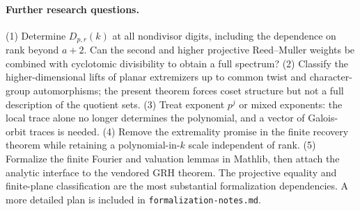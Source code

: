 \documentclass[11pt]{article}
\theoremstyle{remark}\newtheorem{remark}[theorem]{Remark}
\begin{document}
\paragraph{Further research questions.}
(1) Determine $D_{p,r}(k)$ at all nondivisor digits, including the dependence on rank beyond $a+2$. Can the second and higher projective Reed--Muller weights be combined with cyclotomic divisibility to obtain a full spectrum? (2) Classify the higher-dimensional lifts of planar extremizers up to common twist and character-group automorphisms; the present theorem forces coset structure but not a full description of the quotient sets. (3) Treat exponent $p^j$ or mixed exponents: the local trace alone no longer determines the polynomial, and a vector of Galois-orbit traces is needed. (4) Remove the extremality promise in the finite recovery theorem while retaining a polynomial-in-$k$ scale independent of rank. (5) Formalize the finite Fourier and valuation lemmas in Mathlib, then attach the analytic interface to the vendored GRH theorem. The projective equality and finite-plane classification are the most substantial formalization dependencies. A more detailed plan is included in \texttt{formalization-notes.md}.
\end{document}
